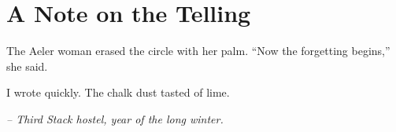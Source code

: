 \chapter*{A Note on the Telling}

The Aeler woman erased the circle with her palm. ``Now the forgetting begins,'' she said.

I wrote quickly. The chalk dust tasted of lime.

\smallskip

\noindent \textit{-- Third Stack hostel, year of the long winter.}

